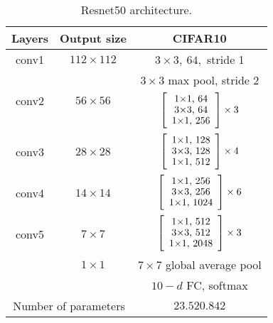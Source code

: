 \begin{table}[H]
    \centering
    \begin{tabular}{|c|c|c|}
    \hline
    Layers                 & Output size                    & CIFAR10                         \\ \hline
    conv1                  & $112\times112$                 & $3\times3, \ 64,$ stride 1      \\ \hline
    \multirow{2}{*}{conv2} & \multirow{2}{*}{$56\times 56$} & $3\times3$ max pool, stride 2   \\ \cline{3-3} 
                           &                                & $\blockb{256}{64}{3}$           \\ \hline
    conv3                  & $28 \times 28$                 & $\blockb{512}{128}{4}$          \\ \hline
    conv4                  & $14 \times 14$                 & $\blockb{1024}{256}{6}$         \\ \hline
    conv5                  & $7 \times 7$                   & $\blockb{2048}{512}{3}$         \\ \hline
    \multirow{2}{*}{}      & $1\times 1$                    & $7\times 7$ global average pool \\ \cline{2-3} 
                           &                                & $10-d$ FC, softmax              \\ \hline
    \multicolumn{2}{|c|}{Number of parameters}              & $23.520.842$                    \\ \hline
    \end{tabular}
    \caption{Resnet50 architecture.}
    \label{table:resnet:50}
    \end{table}

